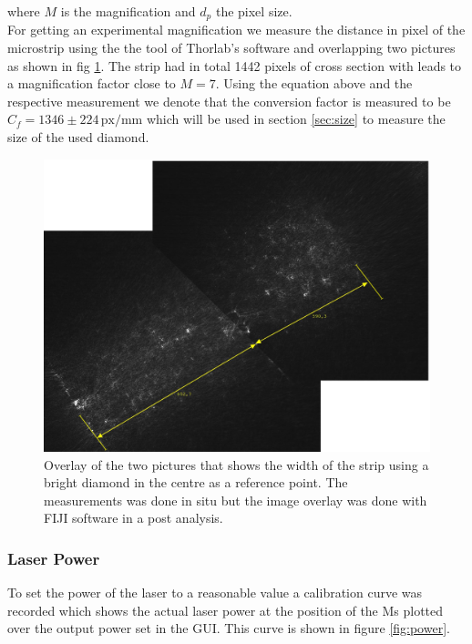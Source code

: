 where $M$ is the magnification and $d_{p}$ the pixel size.\\

For getting an experimental magnification we measure the distance in pixel of the microstrip using the the tool of Thorlab’s software and overlapping two pictures as shown in fig \ref{fig:distance-sslip}. The strip had in total 1442 pixels of cross section  with leads to  a magnification factor close to $M=7$.
Using the equation above and the respective measurement we denote that the conversion factor is measured to be $C_{f} =1346\pm224 \,\mathrm{px/mm}$ which will be used in section \ref{sec:size} to measure the size of the used diamond.

 \begin{figure}
 	\centering
 	\includegraphics[width=0.7\linewidth]{"../figures/distance sslip"}
 	\caption[Width of the microstrip]{Overlay of the two pictures that shows the width of the strip using a bright diamond in the centre as a reference point. The measurements was done in situ but the  image overlay was done with FIJI software in a post analysis.}
 	\label{fig:distance-sslip}
 \end{figure}
 

\subsubsection{Laser Power}
To set the power of the laser to a reasonable value a calibration curve was recorded which shows the actual laser power at the position of the Ms plotted over the output power set in the GUI. This curve is shown in figure \ref{fig:power}.\\

